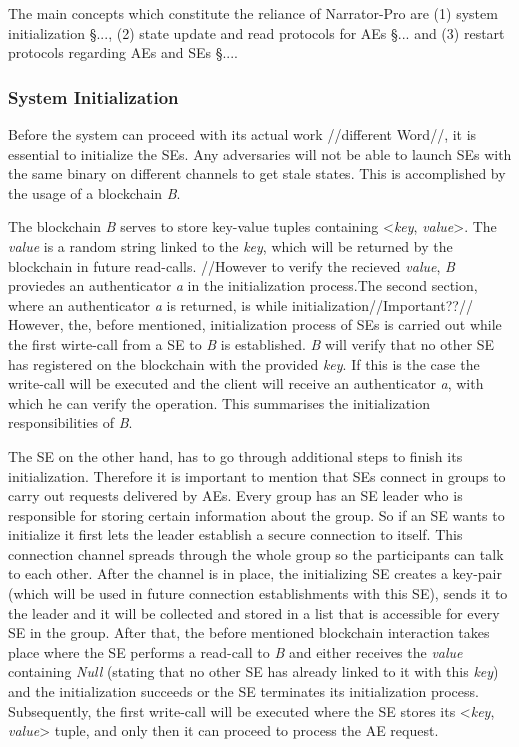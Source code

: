 The main concepts which constitute the reliance of Narrator-Pro are (1) system initialization §..., (2) state update and read protocols for AEs §... and (3) restart protocols regarding AEs and SEs §....

\subsubsection{System Initialization}

Before the system can proceed with its actual work //different Word//, it is essential to initialize the SEs. Any adversaries will not be able to launch SEs with the same binary on different channels to get stale states. This is accomplished by the usage of a blockchain \textit{B}. 

The blockchain \textit{B} serves to store key-value tuples containing <\textit{key}, \textit{value}>. The \textit{value} is a random string linked to the \textit{key}, which will be returned by the blockchain in future read-calls. 
//However to verify the recieved \textit{value}, \textit{B} proviedes an authenticator \textit{a} in the initialization process.The second section, where an authenticator \textit{a} is returned, is while initialization//Important??// 
However, the, before mentioned, initialization process of SEs is carried out while the first wirte-call from a SE to \textit{B} is established. \textit{B} will verify that no other SE has registered on the blockchain with the provided \textit{key}. If this is the case the write-call will be executed and the client will receive an authenticator \textit{a}, with which he can verify the operation. This summarises the initialization responsibilities of \textit{B}.

The SE on the other hand, has to go through additional steps to finish its initialization. Therefore it is important to mention that SEs connect in groups to carry out requests delivered by AEs. Every group has an SE leader who is responsible for storing certain information about the group. So if an SE wants to initialize it first lets the leader establish a secure connection to itself. This connection channel spreads through the whole group so the participants can talk to each other. After the channel is in place, the initializing SE creates a key-pair (which will be used in future connection establishments with this SE), sends it to the leader and it will be collected and stored in a list that is accessible for every SE in the group. After that, the before mentioned blockchain interaction takes place where the SE performs a read-call to \textit{B} and either receives the \textit{value} containing \textit{Null} (stating that no other SE has already linked to it with this \textit{key}) and the initialization succeeds or the SE terminates its initialization process. Subsequently, the first write-call will be executed where the SE stores its <\textit{key}, \textit{value}> tuple, and only then it can proceed to process the AE request.

